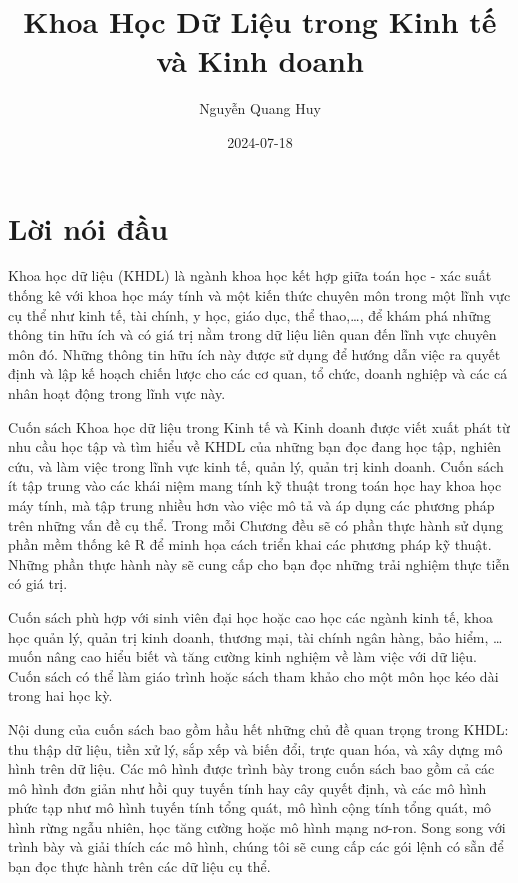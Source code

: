 \documentclass[
]{article}
\title{Khoa Học Dữ Liệu trong Kinh tế và Kinh doanh}
\author{Nguyễn Quang Huy}
\date{2024-07-18}
\begin{document}
\maketitle

{
\setcounter{tocdepth}{2}
\tableofcontents
}
\hypertarget{lux1eddi-nuxf3i-ux111ux1ea7u}{%
\section*{Lời nói đầu}\label{lux1eddi-nuxf3i-ux111ux1ea7u}}

\hfill\break

Khoa học dữ liệu (KHDL) là ngành khoa học kết hợp giữa toán học - xác suất thống kê với khoa học máy tính và một kiến thức chuyên môn trong một lĩnh vực cụ thể như kinh tế, tài chính, y học, giáo dục, thể thao,\ldots, để khám phá những thông tin hữu ích và có giá trị nằm trong dữ liệu liên quan đến lĩnh vực chuyên môn đó. Những thông tin hữu ích này được sử dụng để hướng dẫn việc ra quyết định và lập kế hoạch chiến lược cho các cơ quan, tổ chức, doanh nghiệp và các cá nhân hoạt động trong lĩnh vực này.

Cuốn sách Khoa học dữ liệu trong Kinh tế và Kinh doanh được viết xuất phát từ nhu cầu học tập và tìm hiểu về KHDL của những bạn đọc đang học tập, nghiên cứu, và làm việc trong lĩnh vực kinh tế, quản lý, quản trị kinh doanh. Cuốn sách ít tập trung vào các khái niệm mang tính kỹ thuật trong toán học hay khoa học máy tính, mà tập trung nhiều hơn vào việc mô tả và áp dụng các phương pháp trên những vấn đề cụ thể. Trong mỗi Chương đều sẽ có phần thực hành sử dụng phần mềm thống kê R để minh họa cách triển khai các phương pháp kỹ thuật. Những phần thực hành này sẽ cung cấp cho bạn đọc những trải nghiệm thực tiễn có giá trị.

Cuốn sách phù hợp với sinh viên đại học hoặc cao học các ngành kinh tế, khoa học quản lý, quản trị kinh doanh, thương mại, tài chính ngân hàng, bảo hiểm, \ldots{} muốn nâng cao hiểu biết và tăng cường kinh nghiệm về làm việc với dữ liệu. Cuốn sách có thể làm giáo trình hoặc sách tham khảo cho một môn học kéo dài trong hai học kỳ.

Nội dung của cuốn sách bao gồm hầu hết những chủ đề quan trọng trong KHDL: thu thập dữ liệu, tiền xử lý, sắp xếp và biến đổi, trực quan hóa, và xây dựng mô hình trên dữ liệu. Các mô hình được trình bày trong cuốn sách bao gồm cả các mô hình đơn giản như hồi quy tuyến tính hay cây quyết định, và các mô hình phức tạp như mô hình tuyến tính tổng quát, mô hình cộng tính tổng quát, mô hình rừng ngẫu nhiên, học tăng cường hoặc mô hình mạng nơ-ron. Song song với trình bày và giải thích các mô hình, chúng tôi sẽ cung cấp các gói lệnh có sẵn để bạn đọc thực hành trên các dữ liệu cụ thể.
\end{document}
